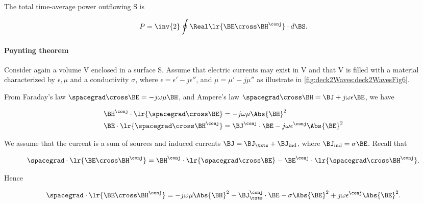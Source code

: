 The total time-average power outflowing S is

\begin{equation}\label{eqn:uwavesLecture2:1200}
P = \inv{2} \oint \Real\lr{ \BE \cross \BH^\conj } \cdot d\BS.
\end{equation}

\paragraph{Poynting theorem}

Consider again a volume V enclosed in a surface S.  Assume that electric currents may exist in V and that V is filled with a material characterized by \( \epsilon, \mu \) and a conductivity \( \sigma \), where \( \epsilon = \epsilon' -j \epsilon'' \), and \( \mu = \mu' - j \mu'' \) as illustrate in \cref{fig:deck2Waves:deck2WavesFig6}.


From Faraday's law \( \spacegrad \cross \BE = - j \omega \mu \BH \), and Ampere's law
\( \spacegrad \cross \BH = \BJ + j \omega \epsilon \BE \), we have

\begin{equation}\label{eqn:uwavesLecture2:1220}
\begin{aligned}
\BH^\conj \cdot \lr{ \spacegrad \cross \BE } &= - j \omega \mu \Abs{\BH}^2 \\
\BE \cdot \lr{ \spacegrad \cross \BH^\conj } &= \BJ^\conj \cdot \BE - j \omega \epsilon^\conj \Abs{\BE}^2
\end{aligned}
\end{equation}

We assume that the current is a sum of sources and induced currents \( \BJ = \BJ_\txts + \BJ_{\mathrm{ind}} \), where \( \BJ_{\mathrm{ind}} = \sigma \BE \).  Recall that

\begin{equation}\label{eqn:uwavesLecture2:1240}
\spacegrad \cdot \lr{ \BE \cross \BH^\conj } =
\BH^\conj \cdot \lr{ \spacegrad \cross \BE }
-\BE^\conj \cdot \lr{ \spacegrad \cross \BH^\conj }.
\end{equation}

Hence

\begin{equation}\label{eqn:uwavesLecture2:1260}
\spacegrad \cdot \lr{ \BE \cross \BH^\conj }
=
- j \omega \mu \Abs{\BH}^2 - \BJ_\txts^\conj \cdot \BE - \sigma \Abs{\BE}^2 + j \omega \epsilon^\conj \Abs{\BE}^2.
\end{equation}

